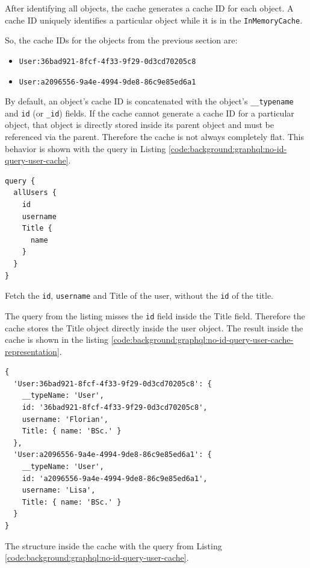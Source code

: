 After identifying all objects, the cache generates a cache ID for each object. A cache ID uniquely identifies a particular object while it is in the \texttt{InMemoryCache}.

\noindent So, the cache IDs for the objects from the previous section are:

\begin{itemize}
    \item \texttt{User:36bad921-8fcf-4f33-9f29-0d3cd70205c8}
    \item \texttt{User:a2096556-9a4e-4994-9de8-86c9e85ed6a1}
\end{itemize}

\noindent By default, an object's cache ID is concatenated with the object's \texttt{\_\_typename} and \texttt{id} (or \texttt{\_id}) fields. If the cache cannot generate a cache ID for a particular object, that object is directly stored inside its parent object and must be referenced via the parent. Therefore the cache is not always completely flat. This behavior is shown with the query in Listing \ref{code:background:graphql:no-id-query-user-cache}. 

\ifshowListings
\begin{listing}[H]
    \begin{verbatim}
query {
  allUsers {
    id
    username
    Title {
      name
    }
  }
}
    \end{verbatim}
    \caption{Fetch the \texttt{id}, \texttt{username} and Title of the user, without the \texttt{id} of the title.}\label{code:background:graphql:no-id-query-user-cache}
\end{listing}
\fi

\noindent The query from the listing misses the \texttt{id} field inside the Title field. Therefore the cache stores the Title object directly inside the user object. The result inside the cache is shown in the listing
\ref{code:background:graphql:no-id-query-user-cache-representation}. 

\ifshowListings
\begin{listing}[H]
    \begin{verbatim}
{
  'User:36bad921-8fcf-4f33-9f29-0d3cd70205c8': {
    __typeName: 'User',
    id: '36bad921-8fcf-4f33-9f29-0d3cd70205c8',
    username: 'Florian',
    Title: { name: 'BSc.' }
  },
  'User:a2096556-9a4e-4994-9de8-86c9e85ed6a1': {
    __typeName: 'User',
    id: 'a2096556-9a4e-4994-9de8-86c9e85ed6a1',
    username: 'Lisa',
    Title: { name: 'BSc.' }
  }
}
    \end{verbatim}
    \caption{The structure inside the cache with the query from Listing \ref{code:background:graphql:no-id-query-user-cache}.}\label{code:background:graphql:no-id-query-user-cache-representation}
\end{listing}
\fi

